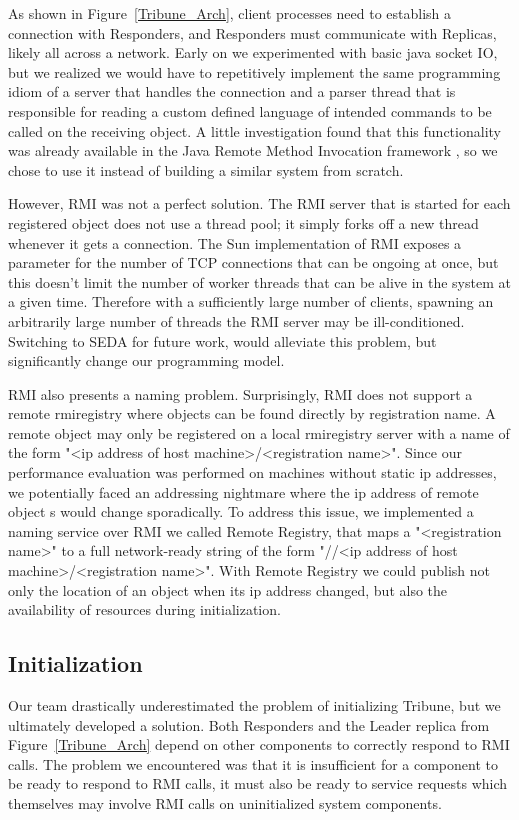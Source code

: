 \documentclass[10pt,twocolumn]{article}
\begin{document}
As shown in Figure~\ref{Tribune_Arch}, client processes need to establish a connection with Responders, and Responders must communicate with Replicas, likely all across a network. Early on we experimented with basic java socket IO, but we realized we would have to repetitively implement the same programming idiom of a server that handles the connection and a parser thread that is responsible for reading a custom defined language of intended commands to be called on the receiving object. A little investigation found that this functionality was already available in the Java Remote Method Invocation framework \cite{Pitt:2001:JRM:558733},  so we chose to use it instead of building a similar system from scratch.

However, RMI was not a perfect solution. The RMI server that is started for each registered object does not use a thread pool; it simply forks off a new thread whenever it gets a connection. The Sun implementation of RMI exposes a parameter for the number of TCP connections that can be ongoing at once, but this doesn't limit the number of worker threads that can be alive in the system at a given time. Therefore with a sufficiently large number of clients, spawning an arbitrarily large number of threads the RMI server may be ill-conditioned. Switching to SEDA \cite{welsh_seda:_2001} for future work, would alleviate this problem, but significantly change our programming model.

RMI also presents a naming problem. Surprisingly, RMI does not support a remote rmiregistry where objects can be found directly by registration name. A remote object may only be registered on a local rmiregistry server with a name of the form "\textless{}ip address of host machine\textgreater{}/\textless{}registration name\textgreater{}".  Since our performance evaluation was performed on machines without static ip addresses, we potentially faced an addressing nightmare where the ip address of remote object s would change sporadically. To address this issue, we implemented a naming service over RMI we called Remote Registry, that maps a "\textless{}registration name\textgreater{}" to a full network-ready string of the form "//\textless{}ip address of host machine\textgreater{}/\textless{}registration name\textgreater{}". With Remote Registry we could publish not only the location of an object when its ip address changed, but also the availability of resources during initialization.

\subsection{Initialization}
Our team drastically underestimated the problem of initializing Tribune, but we ultimately developed a solution. Both Responders and the Leader replica from Figure~\ref{Tribune_Arch} depend on other components to correctly respond to RMI calls. The problem we encountered was that it is insufficient for a component to be ready to respond to RMI calls, it must also be ready to service requests which themselves may involve RMI calls on uninitialized system components.
\end{document}

